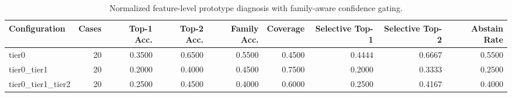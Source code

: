 \begin{table}[t]
\centering
\caption{Normalized feature-level prototype diagnosis with family-aware confidence gating.}
\label{tab:dice_stressor_hierarchical_diagnosis}
\footnotesize
\begin{tabular}{lrrrrrrrr}
\toprule
Configuration & Cases & Top-1 Acc. & Top-2 Acc. & Family Acc. & Coverage & Selective Top-1 & Selective Top-2 & Abstain Rate \\
\midrule
tier0 & 20 & 0.3500 & 0.6500 & 0.5500 & 0.4500 & 0.4444 & 0.6667 & 0.5500 \\
tier0_tier1 & 20 & 0.2000 & 0.4000 & 0.4500 & 0.7500 & 0.2000 & 0.3333 & 0.2500 \\
tier0_tier1_tier2 & 20 & 0.2500 & 0.4500 & 0.4000 & 0.6000 & 0.2500 & 0.4167 & 0.4000 \\
\bottomrule
\end{tabular}

\end{table}
